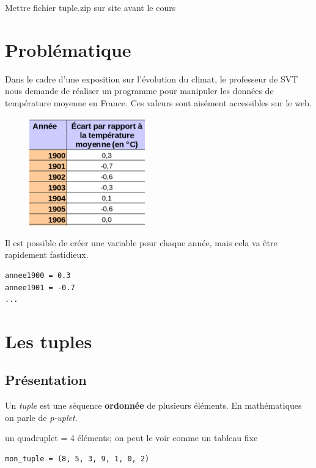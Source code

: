 \documentclass[a4paper,11pt]{article}
\begin{document}
\begin{Form}
\begin{commentprof}
Mettre fichier tuple.zip sur site avant le cours
\end{commentprof}
\section{Problématique}
Dans le cadre d'une exposition sur l'évolution du climat, le professeur de SVT nous demande de réaliser un programme pour manipuler les données de température moyenne en France. Ces valeurs sont aisément accessibles sur le web.
\begin{figure}[!h]
\centering
\includegraphics[width=5cm]{ressources/extrait.png}
\label{extrait}
\end{figure}

Il est possible de créer une variable pour chaque année, mais cela va être rapidement fastidieux.
\begin{code}[!h]
\begin{lstlisting}
annee1900 = 0.3
annee1901 = -0.7
...
\end{lstlisting}
\label{moncode}
\end{code}
\begin{center}
\end{center}
\section{Les tuples}
\subsection{Présentation}
Un \emph{tuple} est une séquence \textbf{ordonnée} de plusieurs éléments. En mathématiques on parle de \emph{p-uplet}.
\begin{commentprof}
un quadruplet = 4 éléments; on peut le voir comme un tableau fixe
\end{commentprof}
\begin{code}[!h]
\begin{lstlisting}
mon_tuple = (8, 5, 3, 9, 1, 0, 2)
\end{lstlisting}
\label{tuple1}
\end{code}

\end{Form}
\end{document}
